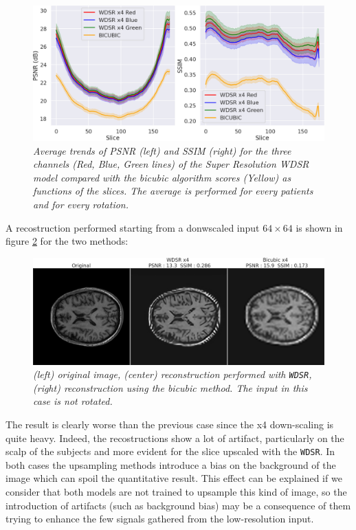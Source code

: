 \documentclass[12pt,a4paper]{report}
\begin{document}
\begin{figure}[H]
  \centering
 \includegraphics[scale=0.37]{./images/wdsr_score_slide.png}
  \caption{\it Average trends of PSNR (left) and SSIM (right) for the three channels (Red, Blue, Green lines) of the Super Resolution WDSR model compared with the bicubic algorithm scores (Yellow) as functions of the slices. The average is performed for every patients and for every rotation.}
 \label{fig:wdsr-score-slide}
\end{figure}

A recostruction performed starting from a donwscaled input $64 \times 64$ is shown in figure \ref{wdsr-upscale} for the two methods:

\begin{figure}[H]
 \centering 
  \includegraphics[scale=0.3]{images/wdsr-comp-images.png}
  \caption{\it (left) original image, (center) reconstruction performed with {\tt WDSR}, (right) reconstruction using the bicubic method. The input in this case is not rotated.}
 \label{wdsr-upscale}
\end{figure}

The result is clearly worse than the previous case since the x4 down-scaling is quite heavy. Indeed, the recostructions show a lot of artifact, particularly on the scalp of the subjects and more evident for the slice upscaled with the {\tt WDSR}.
In both cases the upsampling methods introduce a bias on the background of the image which can spoil the quantitative result.
This effect can be explained if we consider that both models are not trained to upsample this kind of image, so the introduction of artifacts (such as background bias) may be a consequence of them trying to enhance the few signals gathered from the low-resolution input.  
\end{document}

